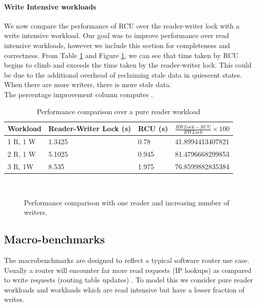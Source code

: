 \documentclass{article}
\begin{document}
\paragraph{Write Intensive workloads}
We now compare the performance of RCU over the reader-writer lock with a write intensive workload. Our goal was to improve performance over read intensive workloads, however we include this section for completeness and correctness. From Table \ref{tbl:writeintensive} and Figure \ref{chart:writeintensive}, we can see that time taken by RCU begins to climb and exceeds the time taken by the reader-writer lock. This could be due to the additional overhead of reclaiming stale data in quiescent states. When there are more writers, there is more stale data. 
\\The percentage improvement column computes .
\begin{table}[tph]
\begin{center}
\begin{tabular}{|l|l|l|l|}
\hline Workload & Reader-Writer Lock (s) & RCU (s) & $\frac{RWLock - RCU}{RWLock}\times100$\\
\hline 1 R, 1 W	& 1.3425 & 0.78	& 41.8994413407821\\
\hline 2 R, 1 W	& 5.1025 & 0.945 & 81.4796668299853\\
\hline 3 R, 1W & 8.535 & 1.975 & 76.8599882835384\\
\hline
\end{tabular}
\end{center}
\label{tbl:writeintensive}
\caption{Performance comparison over a pure reader workload}
\end{table}
\\
\begin{figure}[tph]
\begin{center}
\caption{Performance comparison with one reader and increasing number of writers.}
\label{chart:writeintensive}
\end{center}
\end{figure}


\subsection{Macro-benchmarks}


The macrobenchmarks are designed to reflect a typical software router
use case. Usually a router will encounter far more read requests (IP
lookups) as compared to write requests (routing table updates) . To
model this we consider pure reader workloads and workloads which are
read intensive but have a lesser fraction of writes.
\end{document}

